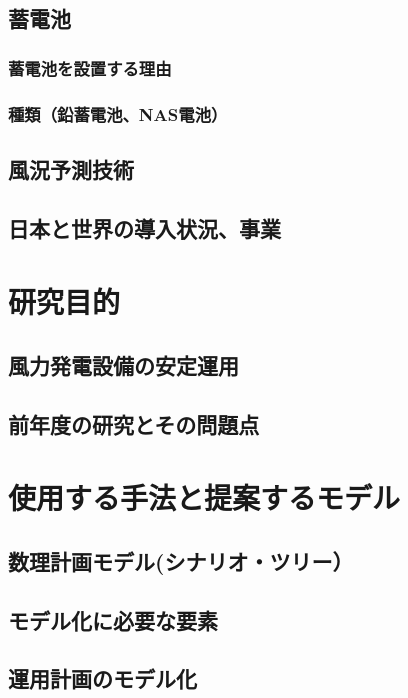 \documentclass[11pt,a4paper]{jsarticle}
\begin{document}
\subsection{蓄電池}

\subsubsection{蓄電池を設置する理由}

\subsubsection{種類（鉛蓄電池、NAS電池）}

\subsection{風況予測技術}

\subsection{日本と世界の導入状況、事業}

\section{研究目的}

\subsection{風力発電設備の安定運用}

\subsection{前年度の研究とその問題点}

\section{使用する手法と提案するモデル}

\subsection{数理計画モデル(シナリオ・ツリー）}

\subsection{モデル化に必要な要素}

\subsection{運用計画のモデル化}
\end{document}
